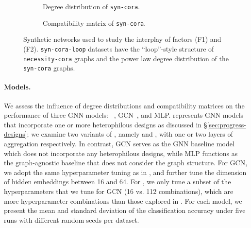 \begin{figure}[hbtp]
    \begin{subfigure}[b]{0.47\textwidth}
        \caption{Degree distribution of \texttt{syn-cora}.}
    \end{subfigure}
    \hspace{0.04\textwidth}
    \begin{subfigure}[b]{0.47\textwidth}
        \caption{Compatibility matrix of \texttt{syn-cora}.}
        \label{fig:revisit-dataset-degree-comp-syn-cora-comp}
    \end{subfigure}

    \caption{Synthetic networks used to study the interplay of factors (F1) and (F2).
    \texttt{syn-cora-loop} datasets have the ``loop''-style structure of \texttt{necessity-cora} graphs and the power law degree distribution of the \texttt{syn-cora} graphs.
    }

    \label{fig:revisit-dataset-degree-comp}
\end{figure}




\paragraph{Models.} We assess the influence of degree distributions and compatibility matrices on the performance of three GNN models: \method~\cite{zhu2020beyond}, GCN~\cite{kipf2016semi}, and MLP.
\method represents GNN models that incorporate one or more heterophilous designs as discussed in \S\ref{sec:progress-designs}; we examine two variants of \method, namely  and , with one or two layers of aggregation respectively.
In contrast, GCN serves as the GNN baseline model which does not incorporate any heterophilous designs, while MLP functions as the graph-agnostic baseline that does not consider the graph structure.
For GCN, we adopt the same hyperparameter tuning as in \cite{ma2021homophily}, and further tune the dimension of hidden embeddings between 16 and 64.
For \method, we only tune a subset of the hyperparameters that we tune for GCN (16 vs. 112 combinations), which are more hyperparameter combinations than those explored in \cite{zhu2020beyond}.
For each model, we present the mean and standard deviation of the classification accuracy under five runs with different random seeds per dataset.

